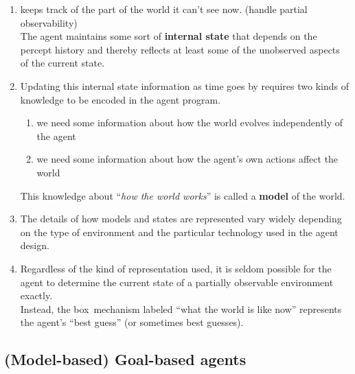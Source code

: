 \vspace{0.3cm}


\begin{enumerate}
    \item keeps track of the part of the world it can’t see now. (handle partial observability)\\
    The agent maintains some sort of \textbf{internal state} that depends on the percept history and thereby reflects at least some of the unobserved aspects of the current state.

    \item Updating this internal state information as time goes by requires two kinds of knowledge to be encoded in the agent program.
    \begin{enumerate}
        \item we need some information about how the world evolves independently of the agent

        \item we need some information about how the agent’s own actions affect the world
    \end{enumerate}
    This knowledge about “\textit{how the world works}” is called a \textbf{model} of the world. 

    \item The details of how models and states are represented vary widely depending on the type of environment and the particular technology used in the agent design. 

    \item Regardless of the kind of representation used, it is seldom possible for the agent to determine the current state of a partially observable environment exactly.\\
    Instead, the box\ mechanism labeled “what the world is like now” represents the agent’s “best guess” (or sometimes best guesses).
\end{enumerate}


\subsection{(Model-based) Goal-based agents \cite{aci-1}}

